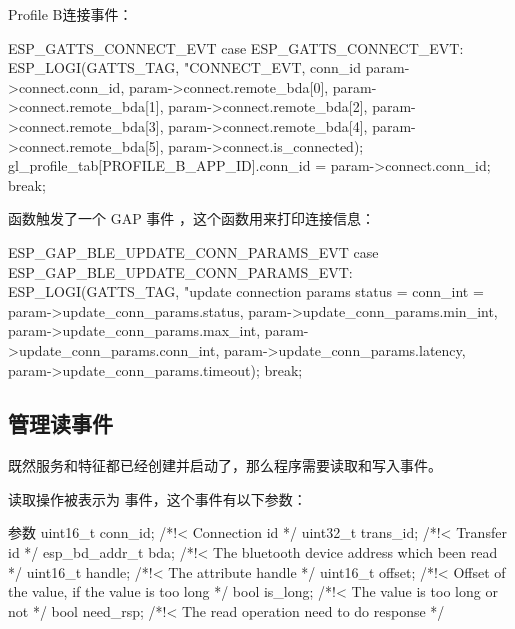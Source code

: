 \documentclass[lang=cn,newtx,10pt,scheme=chinese]{elegantbook}
\begin{document}
Profile B连接事件：

\begin{mycode}{ESP\_GATTS\_CONNECT\_EVT}
case ESP_GATTS_CONNECT_EVT:  
     ESP_LOGI(GATTS_TAG, "CONNECT_EVT, conn_id %
              param->connect.conn_id,  
              param->connect.remote_bda[0],  
              param->connect.remote_bda[1],  
              param->connect.remote_bda[2],  
              param->connect.remote_bda[3],  
              param->connect.remote_bda[4],  
              param->connect.remote_bda[5],  
              param->connect.is_connected);
      gl_profile_tab[PROFILE_B_APP_ID].conn_id = param->connect.conn_id;
      break;
\end{mycode}

 函数触发了一个 GAP 事件 ，这个函数用来打印连接信息：

\begin{mycode}{ESP\_GAP\_BLE\_UPDATE\_CONN\_PARAMS\_EVT}
    case ESP_GAP_BLE_UPDATE_CONN_PARAMS_EVT:
         ESP_LOGI(GATTS_TAG, "update connection params status = %
                  conn_int = %
                  param->update_conn_params.status,
                  param->update_conn_params.min_int,
                  param->update_conn_params.max_int,
                  param->update_conn_params.conn_int,
                  param->update_conn_params.latency,
                  param->update_conn_params.timeout);
         break;
\end{mycode}

\subsection{管理读事件}

既然服务和特征都已经创建并启动了，那么程序需要读取和写入事件。

读取操作被表示为  事件，这个事件有以下参数：

\begin{mycode}{参数}
uint16_t conn_id;          /*!< Connection id */
uint32_t trans_id;         /*!< Transfer id */
esp_bd_addr_t bda;         /*!< The bluetooth device address which been read */
uint16_t handle;           /*!< The attribute handle */
uint16_t offset;           /*!< Offset of the value, if the value is too long */
bool is_long;              /*!< The value is too long or not */
bool need_rsp;             /*!< The read operation need to do response */
\end{mycode}
\end{document}
